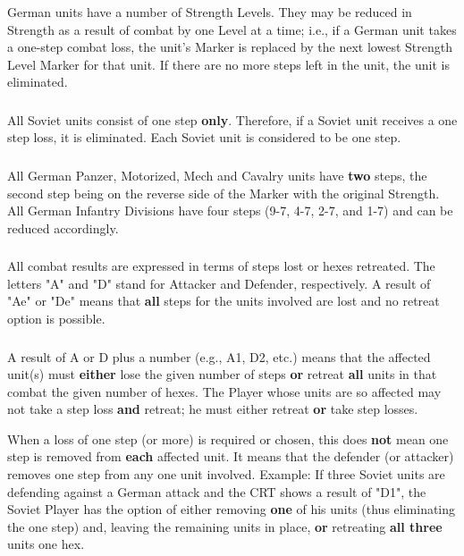 \subsubsection{} German units have a number of Strength Levels. They may be reduced in Strength as a result of combat by one Level at a time; i.e., if a German unit takes a one-step combat loss, the unit's Marker is replaced by the next lowest Strength Level Marker for that unit. If there are no more steps left in the unit, the unit is eliminated.

\subsubsection{} All Soviet units consist of one step \textbf{only}. Therefore, if a Soviet unit receives a one step loss, it is eliminated. Each Soviet unit is considered to be one step.

\subsubsection{} All German Panzer, Motorized, Mech and Cavalry units have \textbf{two} steps, the second step being on the reverse side of the Marker with the original Strength. All German Infantry Divisions have four steps (9-7, 4-7, 2-7, and 1-7) and can be reduced accordingly.

\subsubsection{} All combat results are expressed in terms of steps lost or hexes retreated. The letters "A" and "D" stand for Attacker and Defender, respectively. A result of "Ae" or "De" means that \textbf{all} steps for the units involved are lost and no retreat option is possible.

\subsubsection{} A result of A or D plus a number (e.g., A1, D2, etc.) means that the affected unit(s) must \textbf{either} lose the given number of steps \textbf{or} retreat \textbf{all} units in that combat the given number of hexes. The Player whose units are so affected may not take a step loss \textbf{and} retreat; he must either retreat \textbf{or} take step losses.

When a loss of one step (or more) is required or chosen, this does \textbf{not} mean one step is removed from \textbf{each} affected unit. It means that the defender (or attacker) removes one step from any one unit involved. Example: If three Soviet units are defending against a German attack and the CRT shows a result of "D1", the Soviet Player has the option of either removing \textbf{one} of his units (thus eliminating the one step) and, leaving the remaining units in place, \textbf{or} retreating \textbf{all three} units one hex.

